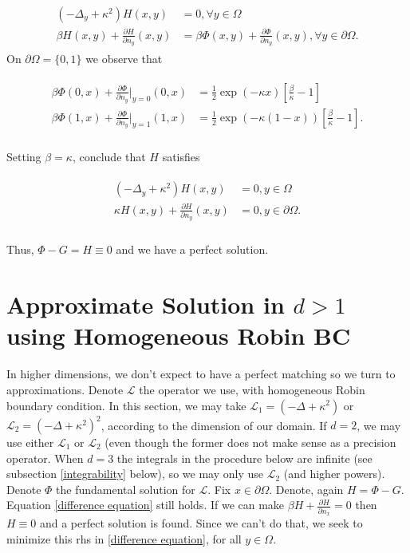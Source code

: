\documentclass[paper=a4, fontsize=11pt]{scrartcl} %
\numberwithin{equation}{section} %
\numberwithin{figure}{section} %
\numberwithin{table}{section} %
\newcommand{\Op}{\mathcal{L}}
\begin{document}
\begin{align}\label{difference equation}
  \begin{split} 
    (-\Delta_{y} + \kappa^2)H(x,y) &= 0, \forall y\in \Omega \\
    \beta H(x,y) + \frac{\partial H}{\partial n_{y}}(x,y) &= \beta \Phi(x,y) + \frac{\partial \Phi}{\partial n_{y}}(x,y), \forall y \in \partial \Omega.
  \end{split}
\end{align}
On $\partial \Omega = \{0,1\}$ we observe that

\begin{align*}
  \begin{split}
    \beta \Phi(0,x) + \frac{\partial \Phi}{\partial n_{y}}|_{y=0}(0,x) &= \frac{1}{2}\exp( -\kappa x)[ \frac{\beta}{\kappa} - 1] \\
    \beta \Phi(1,x) + \frac{\partial \Phi}{\partial n_{y}}|_{y=1}(1,x) &= \frac{1}{2} \exp (-\kappa (1-x)) [\frac{\beta}{\kappa} - 1 ].\\
  \end{split}
\end{align*}

Setting $\beta = \kappa$, conclude that $H$ satisfies

\begin{align*}
  \begin{split}
    (-\Delta_{y} + \kappa^2 ) H(x,y) &= 0 , y\in \Omega \\
    \kappa H(x,y) + \frac{\partial H}{\partial n_{y}}(x,y) &= 0 , y\in \partial \Omega.\\
  \end{split}
\end{align*}

Thus, $\Phi - G = H \equiv 0$ and we have a perfect solution.

\section{Approximate Solution in $d >1$ using Homogeneous Robin BC}

In higher dimensions, we don't expect to have a perfect matching so we turn to approximations.
Denote $\Op$ the operator we use, with homogeneous Robin boundary condition. In this section, we may take 
$\Op_{1} = (-\Delta + \kappa^2)$ or $\Op_{2} = (-\Delta + \kappa^2)^2$, 
according to the dimension of our domain. If $d=2$, we may use either $\Op_{1}$ or $\Op_{2}$ (even though the
former does not make sense as a precision operator. When $d=3$ the integrals in the procedure below are infinite
(see subsection \ref{integrability} below), so we
may only use $\Op_{2}$ (and higher powers). Denote $\Phi$ the fundamental
solution for $\Op$. Fix $x\in \partial \Omega$. Denote, again $H = \Phi - G$. Equation \ref{difference equation}
still holds. If we can make $\beta H + \frac{ \partial H}{\partial n_{x}} =0$ then $H\equiv 0$ and
a perfect solution is found. Since we can't do that, we seek to minimize this rhs in \ref{difference equation},
for all $y\in \Omega$.
\end{document}

